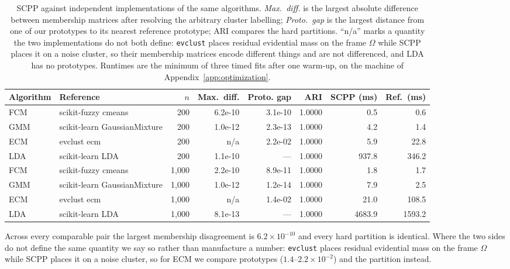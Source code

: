 \documentclass[twoside,11pt]{article}
\begin{document}
\begin{table}[t]
\centering
\small
\caption{SCPP against independent implementations of the same algorithms.
\emph{Max.\ diff.} is the largest absolute difference between membership
matrices after resolving the arbitrary cluster labelling; \emph{Proto.\ gap}
is the largest distance from one of our prototypes to its nearest reference
prototype; ARI compares the hard partitions. ``n/a'' marks a quantity the two
implementations do not both define: \texttt{evclust} places residual evidential
mass on the frame $\Omega$ while SCPP places it on a noise cluster, so their
membership matrices encode different things and are not differenced, and LDA
has no prototypes. Runtimes are the minimum of three timed fits after one
warm-up, on the machine of Appendix~\ref{app:optimization}.}
\label{tab:external-baselines}
\begin{tabular}{llrrrrrr}
\toprule
Algorithm & Reference & $n$ & Max.\ diff. & Proto. gap & ARI & SCPP (ms) & Ref.\ (ms) \\
\midrule
FCM & scikit-fuzzy cmeans & 200 & 6.2e-10 & 3.1e-10 & 1.0000 & 0.5 & 0.6 \\
GMM & scikit-learn GaussianMixture & 200 & 1.0e-12 & 2.3e-13 & 1.0000 & 4.2 & 1.4 \\
ECM & evclust ecm & 200 & n/a & 2.2e-02 & 1.0000 & 5.9 & 22.8 \\
LDA & scikit-learn LDA & 200 & 1.1e-10 & --- & 1.0000 & 937.8 & 346.2 \\
FCM & scikit-fuzzy cmeans & 1,000 & 2.2e-10 & 8.9e-11 & 1.0000 & 1.8 & 1.7 \\
GMM & scikit-learn GaussianMixture & 1,000 & 1.0e-12 & 1.2e-14 & 1.0000 & 7.9 & 2.5 \\
ECM & evclust ecm & 1,000 & n/a & 1.4e-02 & 1.0000 & 21.0 & 108.5 \\
LDA & scikit-learn LDA & 1,000 & 8.1e-13 & --- & 1.0000 & 4683.9 & 1593.2 \\
\bottomrule
\end{tabular}
\end{table}

Across every comparable pair the largest membership disagreement is
$6.2\times10^{-10}$ and every hard partition is identical. Where the two sides
do not define the same quantity we say so rather than manufacture a number:
\texttt{evclust} places residual evidential mass on the frame $\Omega$ while
SCPP places it on a noise cluster, so for ECM we compare prototypes
($1.4$--$2.2\times10^{-2}$) and the partition instead.
\end{document}
